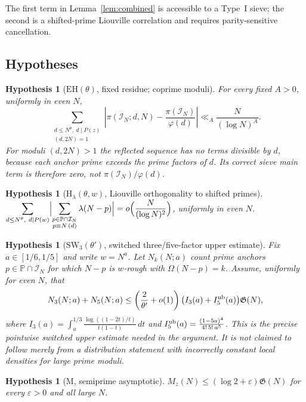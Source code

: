\documentclass[final,11pt]{elsarticle}
\newtheorem{hypothesis}[theorem]{Hypothesis}
\theoremstyle{definition}
\theoremstyle{remark}
\newcommand{\PP}{\mathbb{P}}
\newcommand{\GG}{\mathfrak{G}}
\newcommand{\eps}{\varepsilon}
\newcommand{\band}{\mathcal{I}_N}
\numberwithin{equation}{section}
\begin{document}
The first term in Lemma~\ref{lem:combined} is accessible to a Type~I
sieve; the second is a shifted-prime Liouville correlation and requires
parity-sensitive cancellation.

\subsection{Hypotheses}

\begin{hypothesis}[$\mathrm{EH}(\theta)$, fixed residue; coprime moduli]\label{hyp:EH-corrected}
For every fixed $A>0$, uniformly in even $N$,
\[
\sum_{\substack{d\le N^\theta,\ d\mid P(z)\\ (d,2N)=1}}
\left|\pi(\band;d,N)-\frac{\pi(\band)}{\varphi(d)}\right|
\ll_A\frac{N}{(\log N)^A}.
\]
For moduli $(d,2N)>1$ the reflected sequence has no terms divisible by $d$, because each anchor prime exceeds the prime factors of $d$. Its correct sieve main term is therefore zero, not $\pi(\band)/\varphi(d)$.
\end{hypothesis}

\begin{hypothesis}[$\mathrm{H}_\lambda(\theta,w)$, Liouville orthogonality to shifted primes]
$\displaystyle\sum_{d\le N^{\theta},\ d\mid P(w)}\Bigl|\sum_{\substack{p\in\PP\cap\band\\ p\equiv N\,(d)}}\lambda(N-p)\Bigr|=o\Bigl(\frac{N}{(\log N)^2}\Bigr)$, uniformly in even $N$.
\end{hypothesis}

\begin{hypothesis}[$\mathrm{SW}_3(\theta')$, switched three/five-factor upper estimate]\label{hyp:SW3-revised}
Fix $a\in[1/6,1/5]$ and write $w=N^a$. Let $N_k(N;a)$ count prime anchors $p\in\PP\cap\mathcal I_N$ for which $N-p$ is $w$-rough with $\Omega(N-p)=k$. Assume, uniformly for even $N$, that
\[
N_3(N;a)+N_5(N;a)\le\left(\frac2{\theta'}+o(1)\right)
\bigl(I_3(a)+I_5^{\rm ub}(a)\bigr)\mathfrak G(N),
\]
where $I_3(a)=\int_a^{1/3}\frac{\log((1-2t)/t)}{t(1-t)}\,dt$ and
$I_5^{\rm ub}(a)=\frac{(1-5a)^4}{4!\,5!\,a^5}$. This is the precise \emph{pointwise switched upper estimate} needed in the argument. It is not claimed to follow merely from a distribution statement with incorrectly constant local densities for large prime moduli.
\end{hypothesis}

\begin{hypothesis}[$\mathrm{M}$, semiprime asymptotic]
$M_z(N)\le(\log2+\eps)\GG(N)$ for every $\eps>0$ and all large $N$.
\end{hypothesis}
\end{document}
